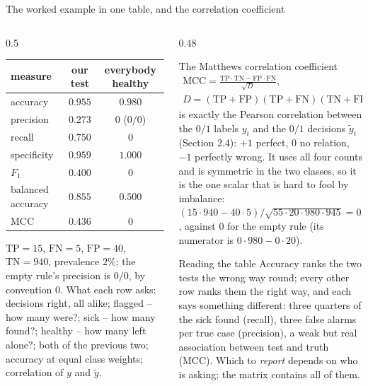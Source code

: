 \documentclass[10pt,aspectratio=169]{beamer}
\begin{document}
\begin{frame}{The worked example in one table, and the correlation coefficient}
\small
\begin{columns}[T]
\begin{column}{0.5\textwidth}
\begin{center}
\scriptsize
\setlength{\tabcolsep}{5pt}
\begin{tabular}{@{}lcc@{}}
\toprule
measure & our test & everybody healthy\\
\midrule
accuracy & $0.955$ & $\mathbf{0.980}$\\
precision & $0.273$ & $0$ ($0/0$)\\
recall & $0.750$ & $0$\\
specificity & $0.959$ & $1.000$\\
$F_1$ & $0.400$ & $0$\\
balanced accuracy & $0.855$ & $0.500$\\
MCC & $0.436$ & $0$\\
\bottomrule
\end{tabular}
\end{center}
\scriptsize
$\mathrm{TP}=15$, $\mathrm{FN}=5$, $\mathrm{FP}=40$, $\mathrm{TN}=940$,
prevalence $2\%$; the empty rule's precision is $0/0$, by convention $0$.
What each row asks: decisions right, all alike; flagged -- how many were?;
sick -- how many found?; healthy -- how many left alone?; both of the
previous two; accuracy at equal class weights; correlation of $y$ and
$\tilde y$.
\end{column}
\begin{column}{0.48\textwidth}
\begin{block}{The Matthews correlation coefficient}
\scriptsize
\begin{gather*}
  \mathrm{MCC}=\frac{\mathrm{TP}\cdot\mathrm{TN}-\mathrm{FP}\cdot\mathrm{FN}}{\sqrt{D}},\\
  D=(\mathrm{TP}+\mathrm{FP})(\mathrm{TP}+\mathrm{FN})(\mathrm{TN}+\mathrm{FP})(\mathrm{TN}+\mathrm{FN}),
\end{gather*}
is exactly the Pearson correlation between the $0/1$ labels $y_i$ and the
$0/1$ decisions $\tilde y_i$ (Section 2.4): $+1$ perfect, $0$ no
relation, $-1$ perfectly wrong.  It uses all four counts and is symmetric
in the two classes, so it is the one scalar that is hard to fool by
imbalance: $(15\cdot940-40\cdot5)/\sqrt{55\cdot20\cdot980\cdot945}=0.436$,
against $0$ for the empty rule (its numerator is $0\cdot980-0\cdot20$).
\end{block}
\begin{block}{Reading the table}
\scriptsize
Accuracy ranks the two tests the wrong way round; every other row ranks
them the right way, and each says something different: three quarters of
the sick found (recall), three false alarms per true case (precision), a
weak but real association between test and truth (MCC).  Which to
\emph{report} depends on who is asking; the matrix contains all of them.
\end{block}
\end{column}
\end{columns}
\end{frame}
\end{document}
